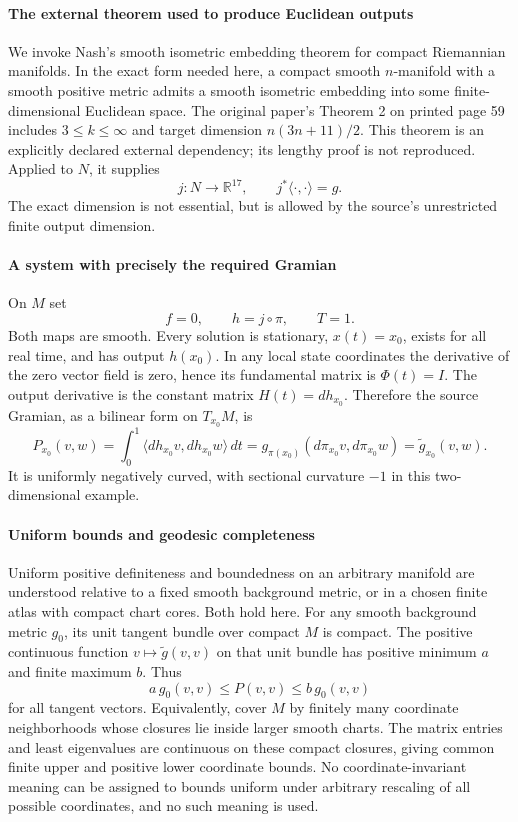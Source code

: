 \documentclass[11pt]{article}
\begin{document}
\paragraph{The external theorem used to produce Euclidean outputs}
We invoke Nash's smooth isometric embedding theorem for compact Riemannian manifolds. In the exact form needed here, a compact smooth $n$-manifold with a smooth positive metric admits a smooth isometric embedding into some finite-dimensional Euclidean space. The original paper's Theorem 2 on printed page 59 includes $3\leq k\leq\infty$ and target dimension $n(3n+11)/2$. This theorem is an explicitly declared external dependency; its lengthy proof is not reproduced. Applied to $N$, it supplies
\[
 j:N\longrightarrow\mathbb R^{17},\qquad j^*\langle\cdot,\cdot\rangle=g.
\]
The exact dimension is not essential, but is allowed by the source's unrestricted finite output dimension.

\paragraph{A system with precisely the required Gramian}
On $M$ set
\[
 f=0,\qquad h=j\circ\pi,\qquad T=1.
\]
Both maps are smooth. Every solution is stationary, $x(t)=x_0$, exists for all real time, and has output $h(x_0)$. In any local state coordinates the derivative of the zero vector field is zero, hence its fundamental matrix is $\Phi(t)=I$. The output derivative is the constant matrix $H(t)=dh_{x_0}$. Therefore the source Gramian, as a bilinear form on $T_{x_0}M$, is
\[
 P_{x_0}(v,w)=\int_0^1\langle dh_{x_0}v,dh_{x_0}w\rangle\,dt
  =g_{\pi(x_0)}(d\pi_{x_0}v,d\pi_{x_0}w)
  =\widetilde g_{x_0}(v,w).
 \tag{1}
\]
It is uniformly negatively curved, with sectional curvature $-1$ in this two-dimensional example.

\paragraph{Uniform bounds and geodesic completeness}
Uniform positive definiteness and boundedness on an arbitrary manifold are understood relative to a fixed smooth background metric, or in a chosen finite atlas with compact chart cores. Both hold here. For any smooth background metric $g_0$, its unit tangent bundle over compact $M$ is compact. The positive continuous function $v\mapsto\widetilde g(v,v)$ on that unit bundle has positive minimum $a$ and finite maximum $b$. Thus
\[
 a\,g_0(v,v)\leq P(v,v)\leq b\,g_0(v,v)
\]
for all tangent vectors. Equivalently, cover $M$ by finitely many coordinate neighborhoods whose closures lie inside larger smooth charts. The matrix entries and least eigenvalues are continuous on these compact closures, giving common finite upper and positive lower coordinate bounds. No coordinate-invariant meaning can be assigned to bounds uniform under arbitrary rescaling of all possible coordinates, and no such meaning is used.
\end{document}
